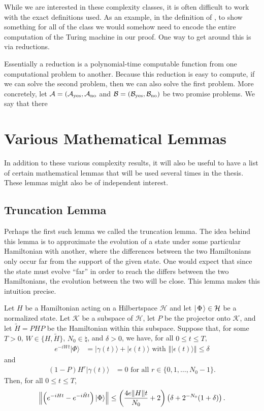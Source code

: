 \documentclass[../thesis-main/thesis-main]{subfiles}
\begin{document}
While we are interested in these complexity classes, it is often difficult to work with the exact definitions used.  As an example, in the definition of \NP, to show something for all of the class we would somehow need to encode the entire computation of the Turing machine in our proof.  One way to get around this is via reductions.

Essentially a reduction is a polynomial-time computable function from one computational problem to another.  Because this reduction is easy to compute, if we can solve the second problem, then we can also solve the first problem.  More concretely, let $\mathcal{A} = (\mathcal{A}_{\text{yes}},\mathcal{A}_{\text{no}}$ and $\mathcal{B}=(\mathcal{B}_{\text{yes}},\mathcal{B}_{\text{no}})$ be two promise problems.  We say that there 


\section{Various Mathematical Lemmas}

In addition to these various complexity results, it will also be useful to have a list of certain mathematical lemmas that will be used several times in the thesis.  These lemmas might also be of independent interest.
\subsection{Truncation Lemma}

Perhaps the first such lemma we called the truncation lemma.  The idea behind this lemma is to approximate the evolution of a state under some particular Hamiltonian with another, where the differences between the two Hamiltonians only occur far from the support of the given state.  One would expect that since the state must evolve ``far'' in order to reach the differs between the two Hamiltonians, the evolution between the two will be close.  This lemma makes this intuition precise.

\begin{lemma}
\label{lem:trunc}
Let $H$ be a Hamiltonian acting on a Hilbertspace $\mathcal{H}$ and let $|\mspace{2mu} \Phi \mspace{2mu} \rangle\in\mathcal{H}$ be a normalized state. Let
$\mathcal{K}$ be a subspace of $\mathcal{H}$, let $P$ be the projector onto $\mathcal{K}$,
and let $\tilde{H}=PHP$ be the Hamiltonian within this subspace. Suppose
that, for some $T>0$, $W\in\{H,\tilde{H}\}$, $N_0\in\natural$,
and $\delta>0$, we have, for all $0\leq t\leq T$, 
\begin{align*}
e^{-iWt}|\Phi\rangle & = |\gamma(t)\rangle+|\epsilon(t)\rangle \text{ with }
\left\Vert |\epsilon(t)\rangle\right\Vert \leq \delta
\end{align*}
and
\begin{align*}
  (1-P) H^{r}|\gamma(t)\rangle & = 0 \text{ for all } r\in\{0,1,\ldots, N_0-1\}.
\end{align*}
Then, for all $0\leq t \leq T$, 
\[
  \left\|{\left(e^{-iHt}-e^{-i\tilde{H}t}\right)|\Phi\rangle}\right\|
  \leq \left(\frac{4e\|{H}\|t}{N_0} + 2 \right) 
        \left(\delta + 2^{-N_0}(1+\delta)\right).
\]
\end{lemma}
\end{document}
